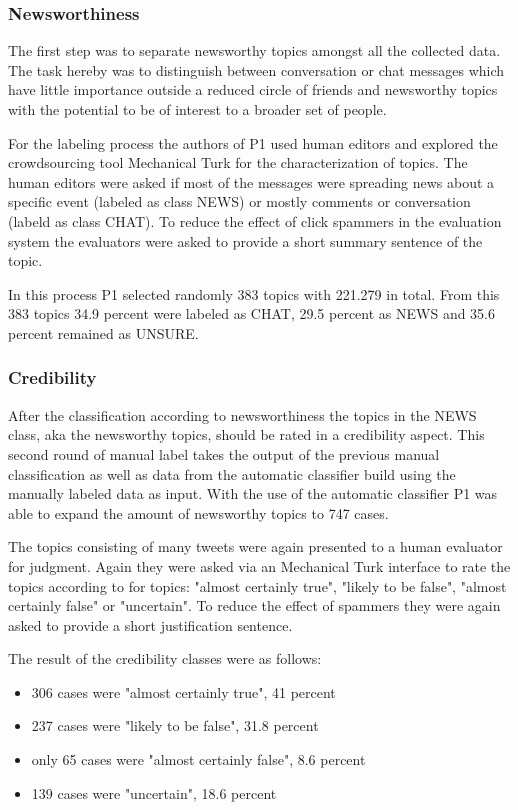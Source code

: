 \documentclass{proseminar}
\begin{document}
\subsubsection*{Newsworthiness}
The first step was to  separate newsworthy topics amongst all the collected data. The task hereby was to distinguish between conversation or chat messages which have little importance outside a reduced circle of friends and newsworthy topics with the potential to be of interest to a broader set of people.

For the labeling process the authors of P1 used human editors and explored the crowdsourcing tool Mechanical Turk for the characterization of topics.
The human editors were asked if most of the messages were spreading news about a specific event (labeled as class NEWS) or mostly comments or conversation (labeld as class CHAT). To  reduce the effect of click spammers in the evaluation system the evaluators were asked to provide a short summary sentence of the topic.

In this process P1 selected randomly 383 topics with 221.279 in total. From this 383 topics 34.9 percent were labeled as CHAT, 29.5 percent as NEWS and 35.6 percent remained as UNSURE.


\subsubsection*{Credibility}
After the classification according to newsworthiness the topics in the NEWS class, aka the newsworthy topics, should be rated in a credibility aspect.
This second round of manual label takes the output of the previous manual classification as well as data from the automatic classifier build using the manually labeled data as input. With the use of the automatic classifier P1 was able to expand the amount of newsworthy topics to 747 cases.

The topics consisting of many tweets were again presented to a human evaluator for judgment. Again they were asked via an Mechanical Turk interface to rate the topics according to for topics: "almost certainly true", "likely to be false", "almost certainly false" or "uncertain". To reduce the effect of spammers they were again asked to provide a short justification sentence. 

The result of the credibility classes were as follows:
\begin{itemize}
\item 306 cases were "almost certainly true", 41 percent
\item 237 cases were "likely to be false", 31.8 percent
\item only 65 cases were "almost certainly false", 8.6 percent
\item 139 cases were "uncertain", 18.6 percent
\end{itemize}
\end{document}
